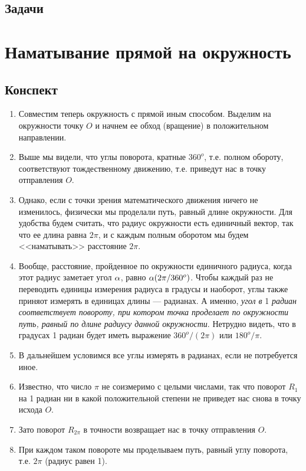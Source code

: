 \subsection{Задачи}



\section{Наматывание прямой на окружность}

\subsection{Конспект}
\begin{enumerate}\setlength{\itemsep}{1pt}
\item Совместим теперь окружность с прямой иным способом. Выделим на окружности точку $O$ и начнем ее обход (вращение) в положительном направлении.
\item Выше мы видели, что углы поворота, кратные $360^o$, т.е. полном обороту, соответствуют тождественному движению, т.е. приведут нас в точку отправления $O$.
\item Однако, если с точки зрения математического движения ничего не изменилось, физически мы проделали путь, равный длине окружности. Для удобства будем считать, что радиус окружности есть единичный вектор, так что ее длина равна $2\pi$, и с каждым полным оборотом мы будем <<наматывать>> расстояние $2\pi$.
\item Вообще, расстояние, пройденное по окружности единичного радиуса, когда этот радиус заметает угол $\alpha$, равно $\alpha(2\pi/360^o)$. Чтобы каждый раз не переводить единицы измерения радиуса в градусы и наоборот, углы также приняот измерять в единицах длины --- радианах. А именно, \textit{угол в} 1 \textit{радиан соответствует повороту, при котором точка проделает по окружности путь, равный по длине радиусу данной окружности}. Нетрудно видеть, что в градусах 1 радиан будет иметь выражение $360^o/(2\pi)$ или $180^o/\pi$.
\item В дальнейшем условимся все углы измерять в радианах, если не потребуется иное.
\item Известно, что число $\pi$ не соизмеримо с целыми числами, так что поворот $R_1$ на 1 радиан ни в какой положительной степени не приведет нас снова в точку исхода $O$.
\item Зато поворот $R_{2\pi}$ в точности возвращает нас в точку отправления $O$.
\item При каждом таком повороте мы проделываем путь, равный углу поворота, т.е. $2\pi$ (радиус равен 1).

\end{enumerate}
